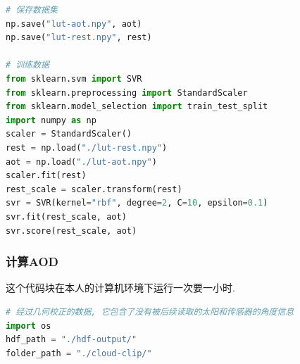 \documentclass{ctexart}
\begin{document}
\begin{sloppypar}
\begin{appendices}
\begin{lstlisting}[frame=single, language=Python, label=train, basicstyle={\ttfamily}, caption={训练数据}]
# 保存数据集
np.save("lut-aot.npy", aot)
np.save("lut-rest.npy", rest)

# 训练数据
from sklearn.svm import SVR
from sklearn.preprocessing import StandardScaler
from sklearn.model_selection import train_test_split
import numpy as np
scaler = StandardScaler()
rest = np.load("./lut-rest.npy")
aot = np.load("./lut-aot.npy")
scaler.fit(rest)
rest_scale = scaler.transform(rest)
svr = SVR(kernel="rbf", degree=2, C=10, epsilon=0.1)
svr.fit(rest_scale, aot)
svr.score(rest_scale, aot)
\end{lstlisting}
\subsubsection{计算AOD}
这个代码块在本人的计算机环境下运行一次要一小时.
\begin{lstlisting}[frame=single, language=Python, basicstyle={\ttfamily}, label=fit, caption={计算AOD}]
# 经过几何校正的数据, 它包含了没有被后续读取的太阳和传感器的角度信息
import os
hdf_path = "./hdf-output/" 
folder_path = "./cloud-clip/"


\end{lstlisting}
\end{appendices}
\end{sloppypar}
\end{document}
